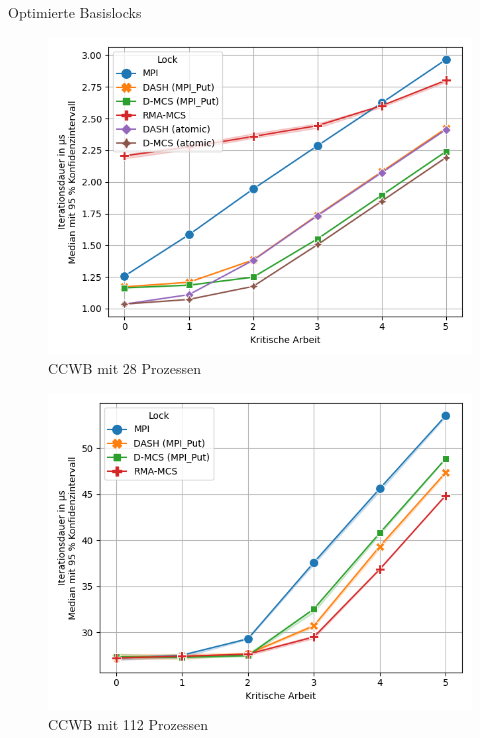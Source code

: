 \documentclass[fleqn,compress,utf8,aspectratio=169,t]{beamer}
\begin{document}
\begin{frame}{Optimierte Basislocks}
    \begin{minipage}{.49\textwidth}
        \begin{figure}
            \includegraphics[width=\textwidth]{../../Dokumentation/Latex/Bilder/benchmarks/intelmpi/baseline-opt/CCWB-processes=28-latency}
            \caption{CCWB mit 28 Prozessen}
        \end{figure}
    \end{minipage}
    \begin{minipage}{.49\textwidth}
        \begin{figure}
            \includegraphics[width=\textwidth]{../../Dokumentation/Latex/Bilder/benchmarks/intelmpi/baseline-opt/CCWB-processes=112-latency}
            \caption{CCWB mit 112 Prozessen}
        \end{figure}
    \end{minipage}
\end{frame}
\end{document}
